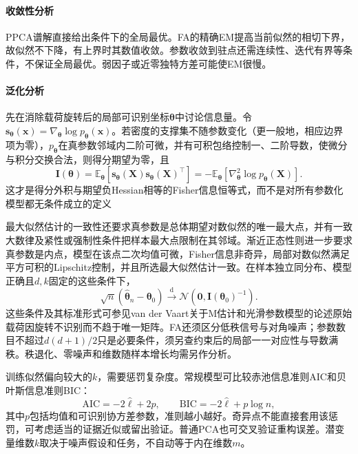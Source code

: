 \paragraph{收敛性分析}

PPCA谱解直接给出条件下的全局最优。FA的精确EM提高当前似然的相切下界，故似然不下降，有上界时其数值收敛。参数收敛到驻点还需连续性、迭代有界等条件，不保证全局最优。弱因子或近零独特方差可能使EM很慢。

\paragraph{泛化分析}

先在消除载荷旋转后的局部可识别坐标$\bm{\theta}$中讨论信息量。令$\bm{s}_{\bm{\theta}}(\bm{x})=\nabla_{\bm{\theta}}\log p_{\bm{\theta}}(\bm{x})$。若密度的支撑集不随参数变化（更一般地，相应边界项为零），$p_{\bm{\theta}}$在真参数邻域内二阶可微，并有可积包络控制一、二阶导数，使微分与积分交换合法，则得分期望为零，且
\[
  \bm{I}(\bm{\theta})
  =\mathbb{E}_{\bm{\theta}}\!\left[
      \bm{s}_{\bm{\theta}}(\bm{X})
      \bm{s}_{\bm{\theta}}(\bm{X})^{\top}
    \right]
  =-\mathbb{E}_{\bm{\theta}}\!\left[
      \nabla_{\bm{\theta}}^2\log p_{\bm{\theta}}(\bm{X})
    \right].
\]
这才是得分外积与期望负Hessian相等的Fisher信息恒等式，而不是对所有参数化模型都无条件成立的定义

最大似然估计的一致性还要求真参数是总体期望对数似然的唯一最大点，并有一致大数律及紧性或强制性条件把样本最大点限制在其邻域。渐近正态性则进一步要求真参数是内点，模型在该点二次均值可微，Fisher信息非奇异，局部对数似然满足平方可积的Lipschitz控制，并且所选最大似然估计一致。在样本独立同分布、模型正确且$d,k$固定的这些条件下，
\[
  \sqrt{n}(\widehat{\bm{\theta}}_n-\bm{\theta}_0)
  \xrightarrow{\mathrm d}
  \mathcal{N}\!\left(
    \bm{0},\bm{I}(\bm{\theta}_0)^{-1}
  \right).
\]
这些条件及其标准形式可参见van der Vaart关于M估计和光滑参数模型的论述原始载荷因旋转不识别而不趋于唯一矩阵。FA还须区分低秩信号与对角噪声；参数数目不超过$d(d+1)/2$只是必要条件，须另查约束后的局部一一对应性与导数满秩。秩退化、零噪声和维数随样本增长均需另作分析。

训练似然偏向较大的$k$，需要惩罚复杂度。常规模型可比较赤池信息准则AIC和贝叶斯信息准则BIC：
\[
\mathrm{AIC}=-2\hat{\ell}+2p,\qquad
\mathrm{BIC}=-2\hat{\ell}+p\log n,
\]
其中$p$包括均值和可识别协方差参数，准则越小越好。奇异点不能直接套用该惩罚，可考虑适当的证据近似或留出验证。普通PCA也可交叉验证重构误差。潜变量维数$k$取决于噪声假设和任务，不自动等于内在维数$m$。

